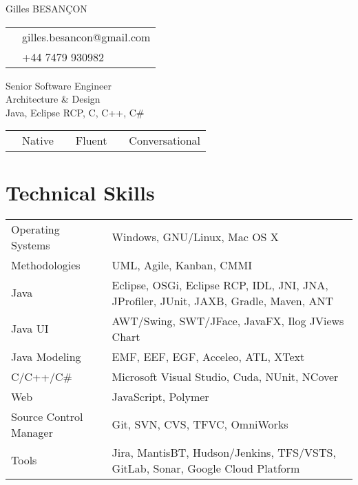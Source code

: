 \documentclass[10pt,letterpaper]{resume/resume}
\begin{document}
  \begin{minipage}[t]{\linewidth * 1 / 3}
    {\Large Gilles BESAN\c{C}ON}\\
      \begin{tabular}{c l}
         \email{&gilles.besancon@gmail.com}\\
         \phone{&+44 7479 930982}\\
      \end{tabular}
  \end{minipage}
  \begin{minipage}[t]{\linewidth * 2 / 3}
    \begin{center}
      {\huge{Senior Software Engineer\\Architecture \& Design\\Java, Eclipse RCP, C, C++, C\#}}
      \begin{tabular}{c l c l c l}
      \french{French:&Native}&\englishus{English:&Fluent}&\spanish{Spanish:&Conversational}\\
      \end{tabular}
    \end{center}
  \end{minipage}
  
  \begin{minipage}[t]{\linewidth}
    \section{Technical Skills}
    \begin{tabular}{ll}
	Operating Systems&Windows, GNU/Linux, Mac OS X\\
	Methodologies&UML, Agile, Kanban, CMMI\\
	Java&Eclipse, OSGi, Eclipse RCP, IDL, JNI, JNA, JProfiler, JUnit, JAXB, Gradle, Maven, ANT\\
	Java UI&AWT/Swing, SWT/JFace, JavaFX, Ilog JViews Chart\\
	Java Modeling&EMF, EEF, EGF, Acceleo, ATL, XText\\
	C/C++/C\#&Microsoft Visual Studio, Cuda, NUnit, NCover\\
	Web&JavaScript, Polymer\\
	Source Control Manager&Git, SVN, CVS, TFVC, OmniWorks\\
	Tools&Jira, MantisBT, Hudson/Jenkins, TFS/VSTS, GitLab, Sonar, Google Cloud Platform\\
    \end{tabular}
  \end{minipage}
  
\end{document}

